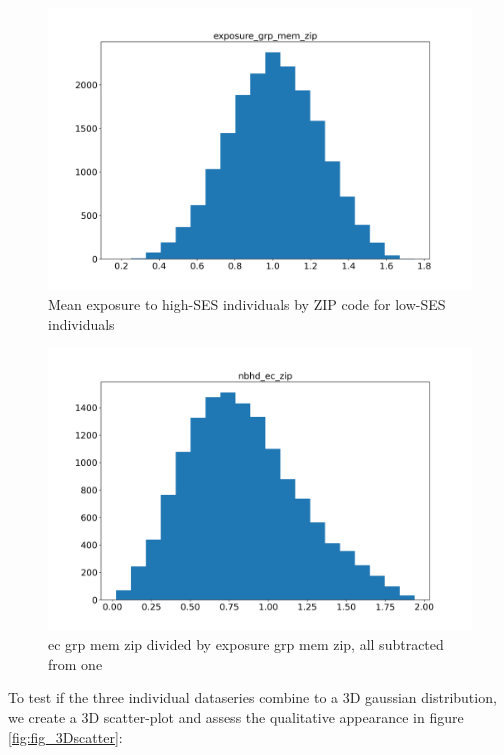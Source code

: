 \begin{figure}[H]
	\centering
	\includegraphics[width=0.9\linewidth]{images/exposure_grp_mem_zip_hist.png}
	\caption{Mean exposure to high-SES individuals by ZIP code for low-SES individuals}
	\label{fig:fig_exposure_grp_mem_zip_hist}
\end{figure}




\begin{figure}[H]
	\centering
	\includegraphics[width=0.9\linewidth]{images/nbhd_ec_zip_hist.png}
	\caption{ec grp mem zip divided by exposure grp mem zip, all subtracted from one}
	\label{fig:fig_nbhd_ec_zip_hist}
\end{figure}



To test if the three individual dataseries combine to a 3D gaussian distribution, we create a 3D scatter-plot and assess the qualitative appearance in figure \ref{fig:fig_3Dscatter}:


